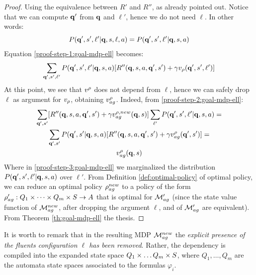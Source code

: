 \begin{proof}
	Using the equivalence between $R'$ and $R''$, as already pointed out.
	Notice that we can compute $\mathbf{q}'$ from $\mathbf{q}$ and $\ell'$, hence we do not need $\ell$. In other words:
	$$P(\mathbf{q}', s', \ell' | \mathbf{q}, s, \ell, a) = P(\mathbf{q}', s', \ell' | \mathbf{q}, s, a)$$
	Equation \ref{proof-step-1:goal-mdp-ell} becomes:
	\begin{gather}\label{proof-step-2:goal-mdp-ell}
	\sum_{\mathbf{q}', s', \ell'} P(\mathbf{q}', s', \ell' | \mathbf{q}, s, a)
	[R''(\mathbf{q},s, a,\mathbf{q}', s') + \gamma v_\rho(\mathbf{q}', s', \ell')]
	\end{gather}
	At this point, we see that $v^\rho$ does not depend from $\ell$, hence we can safely drop $\ell$ as argument for $v_\rho$, obtaining $v_{ag}^{\rho}$. Indeed, from \ref{proof-step-2:goal-mdp-ell}:
	\begin{gather}
		\sum_{\mathbf{q}', s'} [R''(\mathbf{q},s, a,\mathbf{q}', s') + \gamma v_{ag}^{\rho, new}(\mathbf{q}, s)] \sum_{\ell'} P(\mathbf{q}', s', \ell' | \mathbf{q}, s, a) \label{proof-step-3:goal-mdp-ell} =\\
		\sum_{\mathbf{q}', s'} P(\mathbf{q}', s'| \mathbf{q}, s, a)[R''(\mathbf{q},s, a,\mathbf{q}', s') + \gamma v_{ag}^{\rho}(\mathbf{q}', s')] = \nonumber\\
		v_{ag}^{\rho}(\mathbf{q}, s)\nonumber
	\end{gather}
	Where in \ref{proof-step-3:goal-mdp-ell} we marginalized the distribution $P(\mathbf{q}', s', \ell' | \mathbf{q}, s, a)$ over $\ell'$.
	From Definition \ref{def:optimal-policy} of optimal policy, we can reduce an optimal policy $\rho^{new}_{ag}$ to a policy of the form $\rho'_{ag}: Q_1 \times \dots \times Q_m \times S \to A$ that is optimal for $\mathcal{M}_{ag}'$ (since the state value function of $\mathcal{M}_{ag}^{new}$, after dropping the argument $\ell$, and of $\mathcal{M}_{ag}'$ are equivalent). From Theorem \ref{th:goal-mdp-ell} the thesis.
\end{proof}

It is worth to remark that in the resulting MDP $\mathcal{M}_{ag}^{new}$ the \emph{explicit presence of the fluents configuration $\ell$ has been removed}. Rather, the dependency is compiled into the expanded state space $Q_1\times \dots Q_m \times S$, where $Q_1, \dots, Q_m$ are the automata state spaces associated to the formulas $\varphi_i$.

